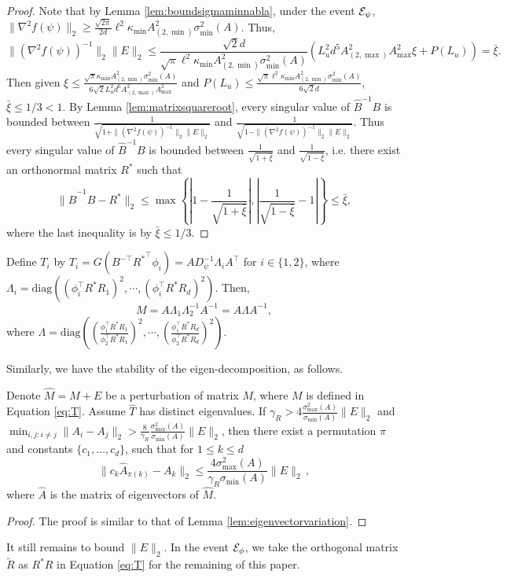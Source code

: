 \begin{proof}
Note that by Lemma \ref{lem:boundsigmaminnabla},  under the event $\mathcal{E}_{\psi}$, $\|\nabla^2f(\psi)\|_2 \ge \frac{\sqrt{2\pi}}{2d}\ell^2\kappa_{\min}A^2_{(2,\min)}\sigma_{\min}^2(A)$. Thus,
\[
\|\left(\nabla^2f(\psi)\right)^{-1}\|_2 \|E\|_2 \le \frac{\sqrt{2}d}{\sqrt{\pi}\ell^2\kappa_{\min}A^2_{(2,\min)}\sigma_{\min}^2(A)}\left(L_u^2d^5 A_{(2,\max)}^2A_{\max}^2\xi + P(L_u)\right) = \bar{\xi}.
\]
Then given $\xi \le \frac{\sqrt{\pi}\kappa_{\min}A^2_{(2,\min)}\sigma_{\min}^2(A)}{6\sqrt{2}L_u^2d^6A_{(2,\max)}^2A_{\max}^2}$
and 
$P(L_u) \le \frac{\sqrt{\pi}\ell^2\kappa_{\min}A^2_{(2,\min)}\sigma_{\min}^2(A)}{6\sqrt{2}d}$, $\bar{\xi} \le 1/3 < 1$. 
By Lemma \ref{lem:matrixsquareroot}, every singular value of $\hat{B}^{-1}B$ is bounded between $\frac{1}{\sqrt{1 + \|\left(\nabla^2f(\psi)\right)^{-1}\|_2 \|E\|_2}}$ and $\frac{1}{\sqrt{1 - \|\left(\nabla^2f(\psi)\right)^{-1}\|_2 \|E\|_2}}$. 
Thus every singular value of $\hat{B}^{-1}B$ is bounded between $\frac{1}{\sqrt{1+\bar{\xi}}}$ and $\frac{1}{\sqrt{1-\bar{\xi}}}$, i.e. there exist an orthonormal matrix $R^*$ such that 
\[
\|\hat{B}^{-1}B - R^*\|_2 \le \max \left\{ \left|1-\frac{1}{\sqrt{1+\bar{\xi}}}\right| , \left|\frac{1}{\sqrt{1-\bar{\xi}}}-1\right| \right\} \le \bar{\xi},
\]
where the last inequality is by $\bar{\xi} \le 1/3$.
\end{proof}

Define $T_i$ by $T_i = G(B^{-\top}{R^*}^{\top}\phi_i) = A D_{\psi}^{-1}\Lambda_iA^{\top}$ for $i \in \{1,2\}$,
where $\Lambda_i = \text{diag}\left((\phi_i^{\top}R^*R_1)^2, \cdots, (\phi_i^{\top}R^*R_d)^2\right)$. 
Then, 
\begin{equation}
\label{eq:T}
M = A \Lambda_1 \Lambda_2^{-1} A^{-1} = A \Lambda A^{-1},
\end{equation}
where $\Lambda = \text{diag}\left((\frac{\phi_1^{\top}R^*R_1}{\phi_2^{\top}R^*R_1})^2, \cdots, (\frac{\phi_1^{\top}R^*R_d}{\phi_2^{\top}R^*R_d})^2\right)$. 

Similarly, we have the stability of the eigen-decomposition, as follows. 
\begin{lemma}
\label{lem:Teigenvectorvariation}
Denote $\hat{M} = M+E$ be a perturbation of matrix $M$, where $M$ is defined in Equation \eqref{eq:T}. 
Assume $\hat{T}$ has distinct eigenvalues. 
If $\gamma_R > 4 \frac{\sigma_{\max}^2(A)}{\sigma_{\min}(A) }\|E\|_2$ and $\min_{i,j:i\neq j} \|A_i - A_j\|_2 > \frac{8}{\gamma_R}\frac{\sigma_{\max}^2(A)}{\sigma_{\min}(A) } \|E\|_2$, then there exist a permutation $\pi$ and constants $\{c_1,\ldots,c_d\}$, such that for $1\le k\le d$
\[
\| c_k\hat{A}_{\pi(k)} - A_k\|_2 \le \frac{4\sigma^2_{\max}(A)}{\gamma_R\sigma_{\min}(A)} \|E\|_2\,,
\]
where $\hat{A}$ is the matrix of eigenvectors of $\hat{M}$. 
\end{lemma}
\begin{proof}
The proof is similar to that of Lemma \ref{lem:eigenvectorvariation}.
\end{proof}
It still remains to bound $\|E\|_2$. In the event $\mathcal{E}_{\phi}$, we take the orthogonal matrix $\tilde{R}$ as $R^*R$ in Equation \ref{eq:T} for the remaining of this paper.

